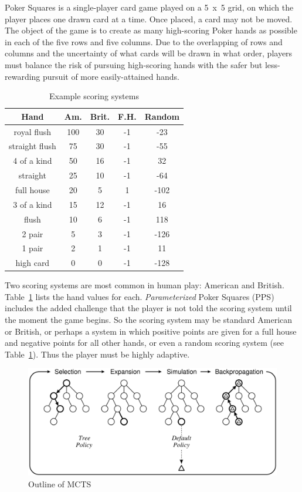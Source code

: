 \documentclass[letterpaper]{article}
\begin{document}
Poker Squares is a single-player card game played on a 5~x~5 grid, on which the player places one drawn card at a time. Once placed, a card may not be moved. The object of the game is to create as many high-scoring Poker hands as possible in each of the five rows and five columns. Due to the overlapping of rows and columns and the uncertainty of what cards will be drawn in what order, players must balance the risk of pursuing high-scoring hands with the safer but less-rewarding pursuit of more easily-attained hands.

\begin{table}
\caption{Example scoring systems}
\label{tbl:scoring}
\centering
\begin{tabular}{c c c c c}
\hline
Hand & Am. & Brit. & F.H. & Random \\
\hline
royal flush     & 100 & 30 & -1 & -23 \\
straight flush & 75 & 30 & -1 & -55 \\
4 of a kind    & 50 & 16 & -1 & 32 \\
straight        & 25 & 10 & -1 & -64 \\
full house     & 20 & 5  & 1 & -102 \\
3 of a kind   & 15 & 12 & -1 & 16 \\
flush           & 10 & 6   & -1 & 118 \\
2 pair         & 5   & 3   & -1 & -126 \\
1 pair         & 2   & 1   & -1 & 11 \\
high card    & 0   & 0   & -1 & -128 \\
\hline
\end{tabular}
\end{table}

Two scoring systems are most common in human play: American and British. Table~\ref{tbl:scoring} lists the hand values for each. {\it Parameterized} Poker Squares (PPS) includes the added challenge that the player is not told the scoring system until the moment the game begins. So the scoring system may be standard American or British, or perhaps a system in which positive points are given for a full house and negative points for all other hands, or even a random scoring system (see Table~\ref{tbl:scoring}). Thus the player must be highly adaptive.

\begin{figure}[b]
\begin{center}
\includegraphics[width=.95\linewidth]{images/oneiteration.png}
\end{center}
\caption{Outline of MCTS~\cite{browne2012survey} }
\label{fig:OneIter}
\end{figure}
\end{document}
